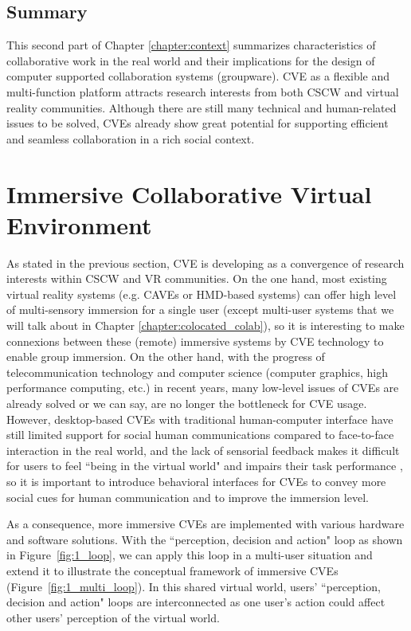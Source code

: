 \subsection{Summary}
This second part of Chapter \ref{chapter:context} summarizes characteristics of collaborative work in the real world and their implications for the design of computer supported collaboration systems (groupware). CVE as a flexible and multi-function platform attracts research interests from both CSCW and virtual reality communities. Although there are still many technical and human-related issues to be solved, CVEs already show great potential for supporting efficient and seamless collaboration in a rich social context.


\newpage

\section{Immersive Collaborative Virtual Environment}
As stated in the previous section, CVE is developing as a convergence of research interests within CSCW and VR communities. On the one hand, most existing virtual reality systems (e.g. CAVEs or HMD-based systems) can offer high level of multi-sensory immersion for a single user (except multi-user systems that we will talk about in Chapter \ref{chapter:colocated_colab}), so it is interesting to make connexions between these (remote) immersive systems by CVE technology to enable group immersion. On the other hand, with the progress of telecommunication technology and computer science (computer graphics, high performance computing, etc.) in recent years, many low-level issues of CVEs are already solved or we can say, are no longer the bottleneck for CVE usage. However, desktop-based CVEs with traditional human-computer interface have still limited support for social human communications compared to face-to-face interaction in the real world, and the lack of sensorial feedback makes it difficult for users to feel ``being in the virtual world" and impairs their task performance \citep{Narayan2005Quantifying, Nam2008Roles}, so it is important to introduce behavioral interfaces for CVEs to convey more social cues for human communication and to improve the immersion level.

As a consequence, more immersive CVEs are implemented with various hardware and software solutions. With the ``perception, decision and action" loop as shown in Figure~\ref{fig:1_loop}, we can apply this loop in a multi-user situation and extend it to illustrate the conceptual framework of immersive CVEs (Figure~\ref{fig:1_multi_loop}). In this shared virtual world, users' ``perception, decision and action" loops are interconnected as one user's action could affect other users' perception of the virtual world.

